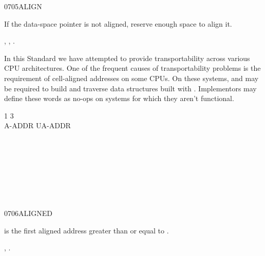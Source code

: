 \begin{worddef}{0705}{ALIGN}
\item \stack{}{}

	If the data-space pointer is not aligned, reserve enough space
	to align it.

\see {},
	,
	.

	\begin{rationale} %
		In this Standard we have attempted to provide transportability
		across various CPU architectures. One of the frequent causes
		of transportability problems is the requirement of cell-aligned
		addresses on some CPUs. On these systems,  and
		 may be required to build and traverse data
		structures built with . Implementors may define these
		words as no-ops on systems for which they aren't functional.
	\end{rationale}

	\begin{testing} %
		\ttfamily
		  1      3   \\
		 A-ADDR   UA-ADDR \\
		 \\
		 \\
		 \\
		 \\
		 \\
		 \\
		 \\
	\end{testing}
\end{worddef}


\begin{worddef}{0706}{ALIGNED}
\item {}

	 is the first aligned address greater than or equal
	to .

\see {},
	.
\end{worddef}


